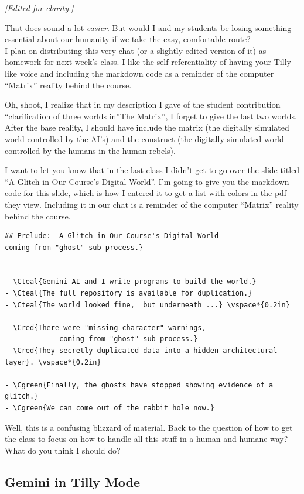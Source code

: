 \documentclass[
]{article}
\begin{document}
\emph{{[}Edited for clarity.{]}}

That does sound a lot \emph{easier}. But would I and my students be
losing something essential about our humanity if we take the easy,
comfortable route?\\
I plan on distributing this very chat (or a slightly edited version of
it) as homework for next week's class. I like the self-referentiality of
having your Tilly-like voice and including the markdown code as a
reminder of the computer ``Matrix'' reality behind the course.

Oh, shoot, I realize that in my description I gave of the student
contribution ``clarification of three worlds in''The Matrix'', I forget
to give the last two worlds. After the base reality, I should have
include the matrix (the digitally simulated world controlled by the
AI's) and the construct (the digitally simulated world controlled by the
humans in the human rebels).

I want to let you know that in the last class I didn't get to go over
the slide titled ``A Glitch in Our Course's Digital World''. I'm going
to give you the markdown code for this slide, which is how I entered it
to get a list with colors in the pdf they view. Including it in our chat
is a reminder of the computer ``Matrix'' reality behind the course.

\begin{verbatim}
## Prelude:  A Glitch in Our Course's Digital World
coming from "ghost" sub-process.}


- \Cteal{Gemini AI and I write programs to build the world.}
- \Cteal{The full repository is available for duplication.}
- \Cteal{The world looked fine,  but underneath ...} \vspace*{0.2in}

- \Cred{There were "missing character" warnings,   
             coming from "ghost" sub-process.}
- \Cred{They secretly duplicated data into a hidden architectural layer}. \vspace*{0.2in}

- \Cgreen{Finally, the ghosts have stopped showing evidence of a glitch.}
- \Cgreen{We can come out of the rabbit hole now.}
\end{verbatim}

Well, this is a confusing blizzard of material. Back to the question of
how to get the class to focus on how to handle all this stuff in a human
and humane way? What do you think I should do?

\subsection{Gemini in Tilly Mode}\label{gemini-in-tilly-mode-2}
\end{document}
